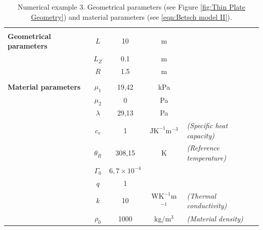 \begin{table}[htbp!]
	\centering
	\caption{Numerical example 3. Geometrical parameters (see Figure \ref{fig:Thin Plate Geometry}) and material parameters (see \eqref{eqn:Betsch model II}).}
	\label{table:Thin Plate parameters}
	\vspace{2mm}
	\begin{tabular}{l | c c c l|}
	\cellcolor{gray!15}&&&&\\
	\cellcolor{gray!15}\textbf{Geometrical parameters}  &  $L$ &  10  &  m  &		\\
	\cellcolor{gray!15}  &  $L_Z$ & 0.1 & m &\\
	\cellcolor{gray!15}	&  $R$ & 1.5 & m &\\
	\hline
	\cellcolor{gray!15}&&&\\
	\cellcolor{gray!15}\textbf{Material parameters}  &  $\mu_1$ &  19,42  &  kPa &
	\\
	\cellcolor{gray!15}&  $\mu_2$ & 0 & Pa &\\ %
	\cellcolor{gray!15}&  $\lambda$ & 29,13 & Pa &\\
	\cellcolor{gray!15}&  $c_v$ & 1 & $\text{J}\text{K}^{-1}\text{m}^{-3}$& \textit{(Specific heat capacity)}\\
	\cellcolor{gray!15}&  $\theta_R$ & 308,15 & K& \textit{(Reference temperature)}\\
	\cellcolor{gray!15}&  $\Gamma_0$ & $6,7\times 10^{-4}$ & &\\
	\cellcolor{gray!15}&  $q$ & 1 & &\\
	\cellcolor{gray!15}&  $k$ & 10 & WK$^{-1}$m$^{-1}$& \textit{(Thermal conductivity)}\\	
	\cellcolor{gray!15}&  $\rho_0$ & 1000 & kg/$\text{m}^3$& \textit{(Material density)}\\				
\end{tabular}
\end{table}


